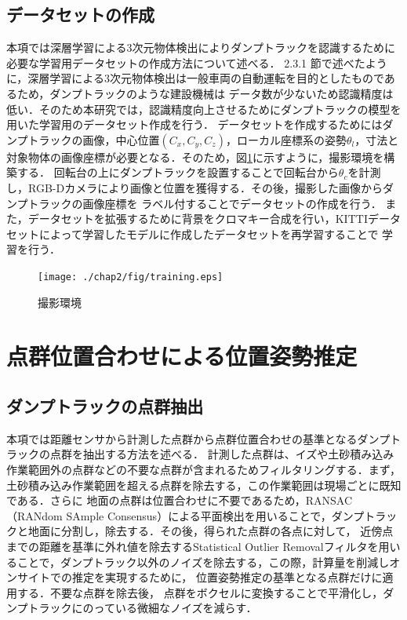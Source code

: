 \clearpage

\subsection{データセットの作成}
本項では深層学習による3次元物体検出によりダンプトラックを認識するために必要な学習用データセットの作成方法について述べる．
2.3.1 節で述べたように，深層学習による3次元物体検出は一般車両の自動運転を目的としたものであるため，ダンプトラックのような建設機械は
データ数が少ないため認識精度は低い．そのため本研究では，認識精度向上させるためにダンプトラックの模型を用いた学習用のデータセット作成を行う．
データセットを作成するためにはダンプトラックの画像，中心位置$(C_x, C_y, C_z)$，ローカル座標系の姿勢$\theta_l$，寸法と対象物体の画像座標が必要となる．そのため，図\ref{fig:train}に示すように，撮影環境を構築する．
回転台の上にダンプトラックを設置することで回転台から$\theta_c$を計測し，RGB-Dカメラにより画像と位置を獲得する．その後，撮影した画像からダンプトラックの画像座標を
ラベル付することでデータセットの作成を行う．
また，データセットを拡張するために背景をクロマキー合成を行い，KITTIデータセット\cite{Geiger2012}によって学習したモデルに作成したデータセットを再学習することで
学習を行う．


\begin{figure}[b]
    \begin{center}
    \texttt{[image: ./chap2/fig/training.eps]}
    \caption{撮影環境}
    \label{fig:train}
    \end{center}
\end{figure}
\newpage

\section{点群位置合わせによる位置姿勢推定}
\subsection{ダンプトラックの点群抽出}
本項では距離センサから計測した点群から点群位置合わせの基準となるダンプトラックの点群を抽出する方法を述べる．
計測した点群は、イズや土砂積み込み作業範囲外の点群などの不要な点群が含まれるためフィルタリングする．まず，土砂積み込み作業範囲を超える点群を除去する，この作業範囲は現場ごとに既知である．さらに
地面の点群は位置合わせに不要であるため，RANSAC （RANdom SAmple Consensus）\cite{Fischler1981}による平面検出を用いることで，ダンプトラックと地面に分割し，除去する．その後，得られた点群の各点に対して，
近傍点までの距離を基準に外れ値を除去するStatistical Outlier Removalフィルタを用いることで，ダンプトラック以外のノイズを除去する，この際，計算量を削減しオンサイトでの推定を実現するために，
位置姿勢推定の基準となる点群だけに適用する．不要な点群を除去後，
点群をボクセルに変換することで平滑化し，ダンプトラックにのっている微細なノイズを減らす．
\newpage

